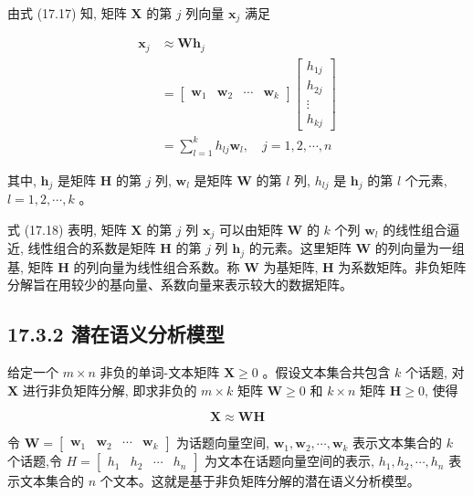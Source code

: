 \documentclass[10pt]{article}
\begin{document}
由式 (17.17) 知, 矩阵 $\boldsymbol{X}$ 的第 $j$ 列向量 $\boldsymbol{x}_{j}$ 满足


\begin{align*}
\boldsymbol{x}_{j} & \approx \boldsymbol{W} \boldsymbol{h}_{j} \\
& =\left[\begin{array}{llll}
\boldsymbol{w}_{1} & \boldsymbol{w}_{2} & \cdots & \boldsymbol{w}_{k}
\end{array}\right]\left[\begin{array}{c}
h_{1 j} \\
h_{2 j} \\
\vdots \\
h_{k j}
\end{array}\right] \\
& =\sum_{l=1}^{k} h_{l j} \boldsymbol{w}_{l}, \quad j=1,2, \cdots, n \tag{17.18}
\end{align*}


其中, $\boldsymbol{h}_{j}$ 是矩阵 $\boldsymbol{H}$ 的第 $j$ 列, $\boldsymbol{w}_{l}$ 是矩阵 $\boldsymbol{W}$ 的第 $l$ 列, $h_{l j}$ 是 $\boldsymbol{h}_{j}$ 的第 $l$ 个元素, $l=1,2, \cdots, k$ 。

式 (17.18) 表明, 矩阵 $\boldsymbol{X}$ 的第 $j$ 列 $\boldsymbol{x}_{j}$ 可以由矩阵 $\boldsymbol{W}$ 的 $k$ 个列 $\boldsymbol{w}_{l}$ 的线性组合逼近, 线性组合的系数是矩阵 $\boldsymbol{H}$ 的第 $j$ 列 $\boldsymbol{h}_{j}$ 的元素。这里矩阵 $\boldsymbol{W}$ 的列向量为一组基, 矩阵 $\boldsymbol{H}$ 的列向量为线性组合系数。称 $\boldsymbol{W}$ 为基矩阵, $\boldsymbol{H}$ 为系数矩阵。非负矩阵分解旨在用较少的基向量、系数向量来表示较大的数据矩阵。

\subsection*{17.3.2 潜在语义分析模型}
给定一个 $m \times n$ 非负的单词-文本矩阵 $\boldsymbol{X} \geqslant 0$ 。假设文本集合共包含 $k$ 个话题, 对 $\boldsymbol{X}$ 进行非负矩阵分解, 即求非负的 $m \times k$ 矩阵 $\boldsymbol{W} \geqslant 0$ 和 $k \times n$ 矩阵 $\boldsymbol{H} \geqslant 0$, 使得


\begin{equation*}
\boldsymbol{X} \approx \boldsymbol{W} \boldsymbol{H} \tag{17.19}
\end{equation*}


令 $\boldsymbol{W}=\left[\begin{array}{llll}\boldsymbol{w}_{1} & \boldsymbol{w}_{2} & \cdots & \boldsymbol{w}_{k}\end{array}\right]$ 为话题向量空间, $\boldsymbol{w}_{1}, \boldsymbol{w}_{2}, \cdots, \boldsymbol{w}_{k}$ 表示文本集合的 $k$ 个话题,令 $H=\left[\begin{array}{llll}h_{1} & h_{2} & \cdots & h_{n}\end{array}\right]$ 为文本在话题向量空间的表示, $h_{1}, h_{2}, \cdots, h_{n}$ 表示文本集合的 $n$ 个文本。这就是基于非负矩阵分解的潜在语义分析模型。
\end{document}

